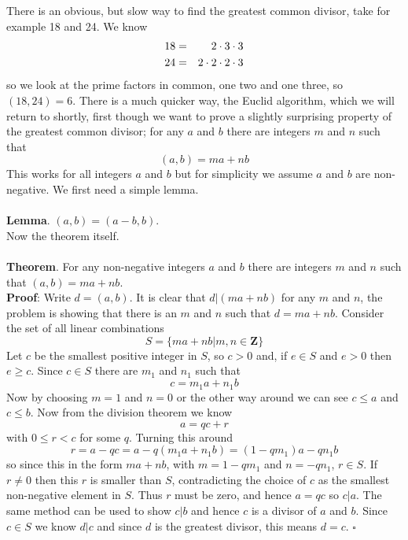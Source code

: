 \documentclass[12pt]{article}
\begin{document}
There is an obvious, but slow way to find the greatest common divisor,
take for example 18 and 24. We know
\begin{eqnarray}
18&=&2\cdot 3\cdot 3\cr
24&=&2\cdot 2\cdot 2\cdot 3
\end{eqnarray}
so we look at the prime factors in common, one two and one three, so
$(18,24)=6$. There is a much quicker way, the Euclid algorithm, which
we will return to shortly, first though we want to prove a slightly
surprising property of the greatest common divisor; for any $a$ and
$b$ there are integers $m$ and $n$ such that
\begin{equation}
(a,b)=ma+nb
\end{equation}
This works for all integers $a$ and $b$ but for simplicity we assume $a$ and $b$ are non-negative. \HandRight We first need a simple lemma.\\
\\
\noindent \textbf{Lemma}. $(a,b)=(a-b,b)$.\\

Now the theorem itself.\\
\\
\noindent \textbf{Theorem}. For any non-negative integers $a$ and $b$ there are integers $m$ and $n$ such that $(a,b)=ma+nb$.\\
\noindent \textbf{Proof}: Write $d=(a,b)$. It is clear that $d|(ma+nb)$ for any
$m$ and $n$, the problem is showing that there is an $m$ and $n$ such
that $d=ma+nb$. Consider the set of all linear combinations
\begin{equation}
S=\{ma+nb|m,n\in\mathbf{Z}\}
\end{equation}
Let $c$ be the smallest positive integer in $S$, so $c>0$ and, if
$e\in S$ and $e>0$ then $e\ge c$. Since $c\in S$ there are $m_1$ and $n_1$ such that
\begin{equation}
c=m_1a+n_1b
\end{equation}
Now by choosing $m=1$ and $n=0$ or the other way around we can see
$c\le a$ and $c\le b$. Now from the division theorem we know
\begin{equation}
a=qc+r
\end{equation}
with $0\le r<c$ for some $q$. Turning this around
\begin{equation}
r=a-qc=a-q(m_1a+n_1b)=(1-qm_1)a-qn_1b
\end{equation}
so since this in the form $ma+nb$, with $m=1-qm_1$ and $n=-qn_1$,
$r\in S$. If $r\not=0$ then this $r$ is smaller than $S$,
contradicting the choice of $c$ as the smallest non-negative element
in $S$. Thus $r$ must be zero, and hence $a=qc$ so $c|a$. The same
method can be used to show $c|b$ and hence $c$ is a divisor of $a$ and
$b$. Since $c\in S$ we know $d|c$ and since $d$ is the greatest
divisor, this means $d=c$. $\square$
\end{document}
